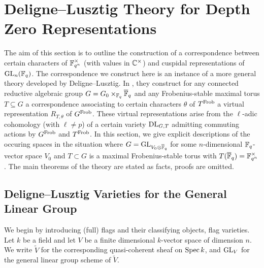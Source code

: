 \documentclass[../main.tex]{subfiles}
\begin{document}
\section{Deligne--Lusztig Theory for Depth Zero Representations} %
\label{sub:Deligne-Lusztig Theory for Depth Zero Representations}
The aim of this section is to outline the construction of a correspondence
between certain characters of $\mathbb{F}_{q^n}^\times$ (with values in $\mathbb{C}^\times$) and 
cuspidal representations of $\operatorname{GL}_n(\mathbb{F}_q)$. The correspondence we construct here
is an instance of a more general theory developed by Deligne--Lusztig. 
In \cite{delignelusztig1976}, they construct
for any connected reductive algebraic group $G = G_0 \times_{\mathbb{F}_q} \overline {\mathbb{F}}_q$ and any
Frobenius-stable maximal torus $T \subseteq G$ a correspondence associating to
certain characters $\theta$ of $T^{\mathrm{Frob}}$ a virtual representation $R_{T,\theta}$ of 
$G^{\mathrm{Frob}}$. These virtual representations arise from the $\ell$-adic cohomology (with
$\ell \neq p$) of a certain variety $\mathrm{DL}_{G,T}$ admitting commuting actions by
$G^{\mathrm{Frob}}$ and $T^{\mathrm{Frob}}$. 
In this section, we give explicit descriptions of the occuring spaces 
in the situation where $G = \operatorname{GL}_{V_0 \otimes \overline {\mathbb{F}}_q}$ for some
$n$-dimensional $\mathbb{F}_q$-vector space $V_0$ and $T \subset G$ is a maximal 
Frobenius-stable torus with $T(\overline {\mathbb{F}}_q) = \mathbb{F}_{q^n}^\times$.
The main theorems of the theory are stated as facts, proofs are omitted.

\subsection{Deligne--Lusztig Varieties for the General Linear Group} %
\label{ssub:Deligne--Lusztig Varieties}
We begin by introducing (full) flags and their classifying objects, flag
varieties. Let $k$ be a field and let $V$ be a finite dimensional $k$-vector space
of dimension $n$. We write $\tilde V$ for the corresponding quasi-coherent sheaf
on $\operatorname{Spec} k$, and $\operatorname{GL}_V$ for the general linear group scheme of $\tilde V$.
\end{document}
